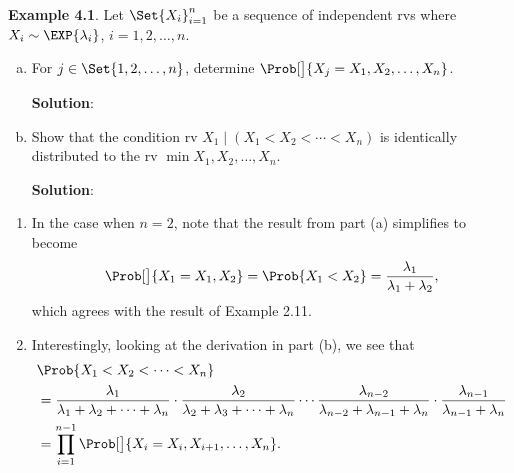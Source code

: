 \begin{Example}
    \textbf{Example 4.1}. Let $ \Set{X_i}_{i=1}^n $ be a sequence of independent rvs where $ X_i \sim \EXP{\lambda_i} $, $ i=1,2,\ldots,n $.
    \begin{enumerate}[(a)]
        \item For $ j\in\Set{1,2,\ldots,n} $, determine $ \Prob[\big]{X_j=\min{X_1,X_2,\ldots,X_n}} $.

              \textbf{Solution}:
        \item Show that the condition rv $ X_1\mid(X_1<X_2<\cdots<X_n) $ is identically distributed to the rv $ \min{X_1,X_2,\ldots,X_n} $.

              \textbf{Solution}:
    \end{enumerate}
    \tcblower{}
    \begin{enumerate}[(1)]
        \item In the case when $ n=2 $, note that the result from part (a) simplifies to become
              \[ \Prob[\big]{X_1=\min{X_1,X_2}}=\Prob{X_1<X_2}=\frac{\lambda_1}{\lambda_1+\lambda_2}, \]
              which agrees with the result of Example 2.11.
        \item Interestingly, looking at the derivation in part (b), we see that
              \begin{align*}
                   & \Prob{X_1<X_2<\cdots<X_n}                                                                                                 \\
                   & =\frac{\lambda_1}{\lambda_1+\lambda_2+\cdots+\lambda_n}\cdot \frac{\lambda_2}{\lambda_2+\lambda_3+\cdots+\lambda_n}\cdots
                  \frac{\lambda_{n-2}}{\lambda_{n-2}+\lambda_{n-1}+\lambda_n}\cdot \frac{\lambda_{n-1}}{\lambda_{n-1}+\lambda_n}               \\
                   & =\prod_{i=1}^{n-1}\Prob[\big]{X_i=\min{X_i,X_{i+1},\ldots,X_n}}.
              \end{align*}
    \end{enumerate}
\end{Example}
